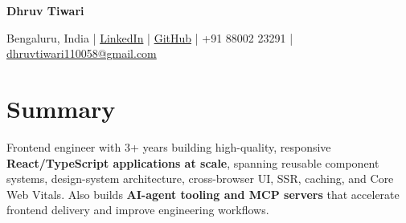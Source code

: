 \documentclass[a4paper,11pt]{article}
\newcommand{\headerfontiii}{\fontfamily{ppl}\selectfont} %
\begin{document}
\headerfontiii

\begin{center}
    {\Huge\textbf{Dhruv Tiwari}}
\end{center}
\vspace{-6mm}

\begin{center}
    \small{
    Bengaluru, India |
    \href{https://www.linkedin.com/in/dhruvtiwari47586/}{LinkedIn} |
    \href{https://github.com/Illusion47586}{GitHub} |
    +91 88002 23291 | \href{mailto:dhruvtiwari110058@gmail.com}{dhruvtiwari110058@gmail.com}
    }
\end{center}

\vspace{-6mm}

\section{\textbf{Summary}}
\vspace{1mm}
\small{
Frontend engineer with 3+ years building high-quality, responsive \textbf{React/TypeScript applications at scale}, spanning reusable component systems, design-system architecture, cross-browser UI, SSR, caching, and Core Web Vitals. Also builds \textbf{AI-agent tooling and MCP servers} that accelerate frontend delivery and improve engineering workflows.
}
\vspace{-2mm}
\end{document}

